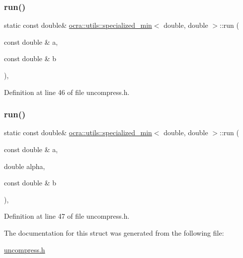 \subsubsection{\texorpdfstring{run()}{run()}\hspace{0.1cm}{\footnotesize\ttfamily [1/2]}}
{\footnotesize\ttfamily static const double\& \hyperlink{structocra_1_1utils_1_1specialized__min}{ocra\+::utils\+::specialized\+\_\+min}$<$ double, double $>$\+::run (\begin{DoxyParamCaption}\item[{const double \&}]{a,  }\item[{const double \&}]{b }\end{DoxyParamCaption})\hspace{0.3cm}{\ttfamily [inline]}, {\ttfamily [static]}}



Definition at line 46 of file uncompress.\+h.

\hypertarget{structocra_1_1utils_1_1specialized__min_3_01double_00_01double_01_4_ab6fb30f9ef59133eb89e51c388c84409}{}\label{structocra_1_1utils_1_1specialized__min_3_01double_00_01double_01_4_ab6fb30f9ef59133eb89e51c388c84409} 
\subsubsection{\texorpdfstring{run()}{run()}\hspace{0.1cm}{\footnotesize\ttfamily [2/2]}}
{\footnotesize\ttfamily static const double\& \hyperlink{structocra_1_1utils_1_1specialized__min}{ocra\+::utils\+::specialized\+\_\+min}$<$ double, double $>$\+::run (\begin{DoxyParamCaption}\item[{const double \&}]{a,  }\item[{double}]{alpha,  }\item[{const double \&}]{b }\end{DoxyParamCaption})\hspace{0.3cm}{\ttfamily [inline]}, {\ttfamily [static]}}



Definition at line 47 of file uncompress.\+h.



The documentation for this struct was generated from the following file\+:\begin{DoxyCompactItemize}
\item 
\hyperlink{uncompress_8h}{uncompress.\+h}\end{DoxyCompactItemize}
